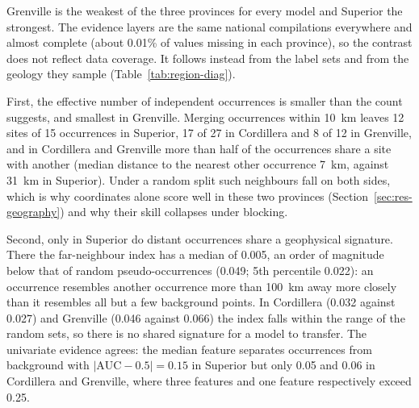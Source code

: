 \documentclass[pdflatex,sn-apa]{sn-jnl}
\begin{document}
Grenville is the weakest of the three provinces for every model and Superior the strongest. The evidence layers are the same national compilations everywhere and almost complete (about 0.01\% of values missing in each province), so the contrast does not reflect data coverage. It follows instead from the label sets and from the geology they sample (Table~\ref{tab:region-diag}).

First, the effective number of independent occurrences is smaller than the count suggests, and smallest in Grenville. Merging occurrences within 10~km leaves 12 sites of 15 occurrences in Superior, 17 of 27 in Cordillera and 8 of 12 in Grenville, and in Cordillera and Grenville more than half of the occurrences share a site with another (median distance to the nearest other occurrence 7~km, against 31~km in Superior). Under a random split such neighbours fall on both sides, which is why coordinates alone score well in these two provinces (Section~\ref{sec:res-geography}) and why their skill collapses under blocking.

Second, only in Superior do distant occurrences share a geophysical signature. There the far-neighbour index has a median of 0.005, an order of magnitude below that of random pseudo-occurrences (0.049; 5th percentile 0.022): an occurrence resembles another occurrence more than 100~km away more closely than it resembles all but a few background points. In Cordillera (0.032 against 0.027) and Grenville (0.046 against 0.066) the index falls within the range of the random sets, so there is no shared signature for a model to transfer. The univariate evidence agrees: the median feature separates occurrences from background with $|\mathrm{AUC}-0.5| = 0.15$ in Superior but only 0.05 and 0.06 in Cordillera and Grenville, where three features and one feature respectively exceed 0.25.
\end{document}

